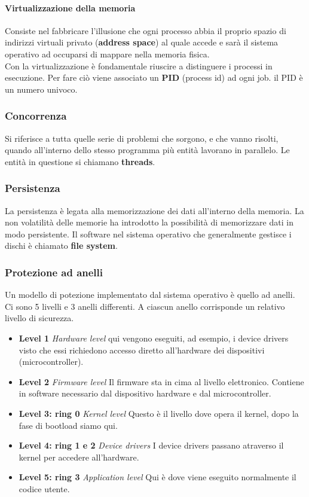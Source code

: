 \documentclass[12pt, twoside, letterpaper]{article}
\begin{document}
				\paragraph{Virtualizzazione della memoria} Consiste nel fabbricare l'illusione che ogni processo abbia il proprio spazio di indirizzi virtuali privato (\textbf{address space}) al quale accede e sarà il sistema operativo ad occuparsi di mappare nella memoria fisica.\\
						
				Con la virtualizzazione è fondamentale riuscire a distinguere i processi in esecuzione. Per fare ciò viene associato un \textbf{PID} (process id) ad ogni job. il PID è un numero univoco.
		
			\subsubsection{Concorrenza} Si riferisce a tutta quelle serie di problemi che sorgono, e che vanno risolti, quando all'interno dello stesso programma più entità lavorano in parallelo. Le entità in questione si chiamano \textbf{threads}.
			
			\subsubsection{Persistenza} La persistenza è legata alla memorizzazione dei dati all'interno della memoria. La non volatilità delle memorie ha introdotto la possibilità di memorizzare dati in modo persistente. Il software nel sistema operativo che generalmente gestisce i dischi è chiamato \textbf{file system}.
			
			\subsubsection{Protezione ad anelli}
				Un modello di potezione implementato dal sistema operativo è quello ad anelli. Ci sono 5 livelli e 3 anelli differenti. A ciascun anello corrisponde un relativo livello di sicurezza. 
				\begin{itemize}
					\item \textbf{Level 1}\textit{ Hardware level} qui vengono eseguiti, ad esempio, i device drivers visto che essi richiedono accesso diretto all'hardware dei dispositivi (microcontroller).
					\item \textbf{Level 2}\textit{ Firmware level} Il  firmware sta in cima al livello elettronico. Contiene in software necessario dal dispositivo hardware e dal microcontroller. 
					\item \textbf{Level 3: ring 0}\textit{ Kernel level} Questo è il livello dove opera il kernel, dopo la fase di bootload siamo qui.
					\item \textbf{Level 4: ring 1 e 2}\textit{ Device drivers} I device drivers passano atraverso il kernel per accedere all'hardware.
					\item \textbf{Level 5: ring 3}\textit{ Application level} Qui è dove viene eseguito normalmente il codice utente.
				\end{itemize}
						
\end{document}
